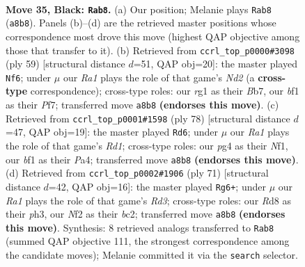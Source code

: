 \documentclass[11pt]{article}
\begin{document}
\clearpage

\begin{figure}[p]\centering
\begin{subfigure}{0.46\textwidth}\centering
\resizebox{\linewidth}{!}{%
\newchessgame
\chessboard[
  setfen={r2r4/pb1p1pk1/8/4R3/6P1/8/PPK2n2/2B2BR1 b - - 3 35},
  showmover=false,
  pgfstyle=straightmove, color=movearrow, markmove={a8-b8}
]}
\caption{}
\end{subfigure}\hfill
\begin{subfigure}{0.46\textwidth}\centering
\resizebox{\linewidth}{!}{%
\newchessgame
\chessboard[
  setfen={5r1k/1b1n1pp1/7p/3p4/1N6/4P3/5PPP/2RB2K1 b - - 0 30},
  showmover=false,
  pgfstyle=straightmove, color=movearrow, markmove={d7-f6}
]}
\caption{}
\end{subfigure}
\\[4pt]
\begin{subfigure}{0.46\textwidth}\centering
\resizebox{\linewidth}{!}{%
\newchessgame
\chessboard[
  setfen={4r3/n4pk1/b5p1/8/P7/5BP1/1r6/R2R1NK1 w - - 6 40},
  showmover=false,
  pgfstyle=straightmove, color=movearrow, markmove={d1-d6}
]}
\caption{}
\end{subfigure}\hfill
\begin{subfigure}{0.46\textwidth}\centering
\resizebox{\linewidth}{!}{%
\newchessgame
\chessboard[
  setfen={1r3b1k/2R4p/1p1r4/5p2/8/7P/PPB1RP2/6K1 b - - 1 36},
  showmover=false,
  pgfstyle=straightmove, color=movearrow, markmove={d6-g6}
]}
\caption{}
\end{subfigure}
\caption{\textbf{Move 35, Black: \texttt{Rab8}.} (a) Our position; Melanie plays \texttt{Rab8} (\texttt{a8b8}). Panels (b)--(d) are the retrieved master positions whose correspondence most drove this move (highest QAP objective among those that transfer to it). (b) Retrieved from \texttt{ccrl\_top\_p0000\#3098} (ply 59) [structural distance $d$=51, QAP obj=20]: the master played \texttt{Nf6}; under $\mu$ our \emph{Ra1} plays the role of that game's \emph{Nd2} (a \textbf{cross-type} correspondence); cross-type roles: our \emph{r}g1 as their \emph{B}b7, our \emph{b}f1 as their \emph{P}f7; transferred move \texttt{a8b8} \textbf{(endorses this move)}. (c) Retrieved from \texttt{ccrl\_top\_p0001\#1598} (ply 78) [structural distance $d$=47, QAP obj=19]: the master played \texttt{Rd6}; under $\mu$ our \emph{Ra1} plays the role of that game's \emph{Rd1}; cross-type roles: our \emph{p}g4 as their \emph{N}f1, our \emph{b}f1 as their \emph{P}a4; transferred move \texttt{a8b8} \textbf{(endorses this move)}. (d) Retrieved from \texttt{ccrl\_top\_p0002\#1906} (ply 71) [structural distance $d$=42, QAP obj=16]: the master played \texttt{Rg6+}; under $\mu$ our \emph{Ra1} plays the role of that game's \emph{Rd3}; cross-type roles: our \emph{R}d8 as their \emph{p}h3, our \emph{N}f2 as their \emph{b}c2; transferred move \texttt{a8b8} \textbf{(endorses this move)}. Synthesis: 8 retrieved analogs transferred to \texttt{Rab8} (summed QAP objective 111, the strongest correspondence among the candidate moves); Melanie committed it via the \texttt{search} selector.}
\label{fig:thought-m69}
\end{figure}
\end{document}
